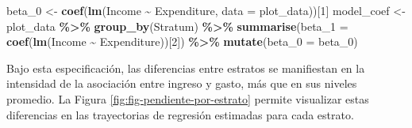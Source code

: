 \documentclass[
  spanish,
  12pt,
]{book}
\newenvironment{Shaded}{\begin{snugshade}}{\end{snugshade}}
\newcommand{\AttributeTok}[1]{\textcolor[rgb]{0.13,0.29,0.53}{#1}}
\newcommand{\DecValTok}[1]{\textcolor[rgb]{0.00,0.00,0.81}{#1}}
\newcommand{\FloatTok}[1]{\textcolor[rgb]{0.00,0.00,0.81}{#1}}
\newcommand{\FunctionTok}[1]{\textcolor[rgb]{0.13,0.29,0.53}{\textbf{#1}}}
\newcommand{\NormalTok}[1]{#1}
\newcommand{\OtherTok}[1]{\textcolor[rgb]{0.56,0.35,0.01}{#1}}
\newcommand{\SpecialCharTok}[1]{\textcolor[rgb]{0.81,0.36,0.00}{\textbf{#1}}}
\newcommand{\StringTok}[1]{\textcolor[rgb]{0.31,0.60,0.02}{#1}}
\begin{document}
\begin{Shaded}
\begin{Highlighting}[]
\NormalTok{beta\_0 }\OtherTok{\textless{}{-}} \FunctionTok{coef}\NormalTok{(}\FunctionTok{lm}\NormalTok{(Income }\SpecialCharTok{\textasciitilde{}}\NormalTok{ Expenditure, }\AttributeTok{data =}\NormalTok{ plot\_data))[}\DecValTok{1}\NormalTok{]}
\NormalTok{model\_coef }\OtherTok{\textless{}{-}}\NormalTok{ plot\_data }\SpecialCharTok{\%\textgreater{}\%}
  \FunctionTok{group\_by}\NormalTok{(Stratum) }\SpecialCharTok{\%\textgreater{}\%}
  \FunctionTok{summarise}\NormalTok{(}\AttributeTok{beta\_1 =} \FunctionTok{coef}\NormalTok{(}\FunctionTok{lm}\NormalTok{(Income }\SpecialCharTok{\textasciitilde{}}\NormalTok{ Expenditure))[}\DecValTok{2}\NormalTok{]) }\SpecialCharTok{\%\textgreater{}\%}
  \FunctionTok{mutate}\NormalTok{(}\AttributeTok{beta\_0 =}\NormalTok{ beta\_0)}
\end{Highlighting}
\end{Shaded}

Bajo esta especificación, las diferencias entre estratos se manifiestan en la intensidad de la asociación entre ingreso y gasto, más que en sus niveles promedio. La Figura \ref{fig:fig-pendiente-por-estrato} permite visualizar estas diferencias en las trayectorias de regresión estimadas para cada estrato.

\begin{Shaded}
\end{Shaded}
\end{document}
